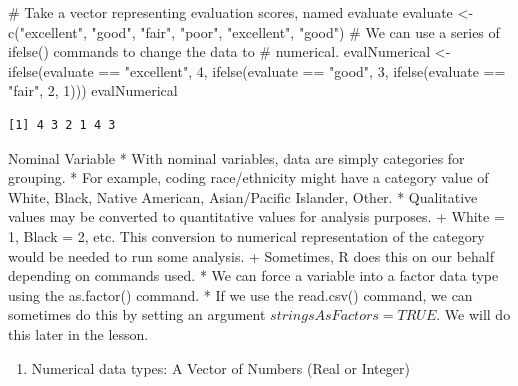 \documentclass[
  letterpaper,
  DIV=11,
  numbers=noendperiod]{scrreprt}
\newenvironment{Shaded}{\begin{snugshade}}{\end{snugshade}}
\newcommand{\CommentTok}[1]{\textcolor[rgb]{0.37,0.37,0.37}{#1}}
\newcommand{\DecValTok}[1]{\textcolor[rgb]{0.68,0.00,0.00}{#1}}
\newcommand{\FunctionTok}[1]{\textcolor[rgb]{0.28,0.35,0.67}{#1}}
\newcommand{\NormalTok}[1]{\textcolor[rgb]{0.00,0.23,0.31}{#1}}
\newcommand{\OtherTok}[1]{\textcolor[rgb]{0.00,0.23,0.31}{#1}}
\newcommand{\SpecialCharTok}[1]{\textcolor[rgb]{0.37,0.37,0.37}{#1}}
\newcommand{\StringTok}[1]{\textcolor[rgb]{0.13,0.47,0.30}{#1}}
\providecommand{\tightlist}{%
  \setlength{\itemsep}{0pt}\setlength{\parskip}{0pt}}\usepackage{longtable,booktabs,array}
\begin{document}
\begin{Shaded}
\begin{Highlighting}[]
\CommentTok{\# Take a vector representing evaluation scores, named evaluate}
\NormalTok{evaluate }\OtherTok{\textless{}{-}} \FunctionTok{c}\NormalTok{(}\StringTok{"excellent"}\NormalTok{, }\StringTok{"good"}\NormalTok{, }\StringTok{"fair"}\NormalTok{, }\StringTok{"poor"}\NormalTok{, }\StringTok{"excellent"}\NormalTok{, }\StringTok{"good"}\NormalTok{)}
\CommentTok{\# We can use a series of ifelse() commands to change the data to}
\CommentTok{\# numerical.}
\NormalTok{evalNumerical }\OtherTok{\textless{}{-}} \FunctionTok{ifelse}\NormalTok{(evaluate }\SpecialCharTok{==} \StringTok{"excellent"}\NormalTok{, }\DecValTok{4}\NormalTok{, }\FunctionTok{ifelse}\NormalTok{(evaluate }\SpecialCharTok{==}
    \StringTok{"good"}\NormalTok{, }\DecValTok{3}\NormalTok{, }\FunctionTok{ifelse}\NormalTok{(evaluate }\SpecialCharTok{==} \StringTok{"fair"}\NormalTok{, }\DecValTok{2}\NormalTok{, }\DecValTok{1}\NormalTok{)))}
\NormalTok{evalNumerical}
\end{Highlighting}
\end{Shaded}

\begin{verbatim}
[1] 4 3 2 1 4 3
\end{verbatim}

Nominal Variable * With nominal variables, data are simply categories
for grouping. * For example, coding race/ethnicity might have a category
value of White, Black, Native American, Asian/Pacific Islander, Other. *
Qualitative values may be converted to quantitative values for analysis
purposes. + White = 1, Black = 2, etc. This conversion to numerical
representation of the category would be needed to run some analysis. +
Sometimes, R does this on our behalf depending on commands used. * We
can force a variable into a factor data type using the as.factor()
command. * If we use the read.csv() command, we can sometimes do this by
setting an argument \(stringsAsFactors=TRUE\). We will do this later in
the lesson.

\begin{enumerate}
\def\labelenumi{\arabic{enumi}.}
\setcounter{enumi}{1}
\tightlist
\item
  Numerical data types: A Vector of Numbers (Real or Integer)
\end{enumerate}
\end{document}
